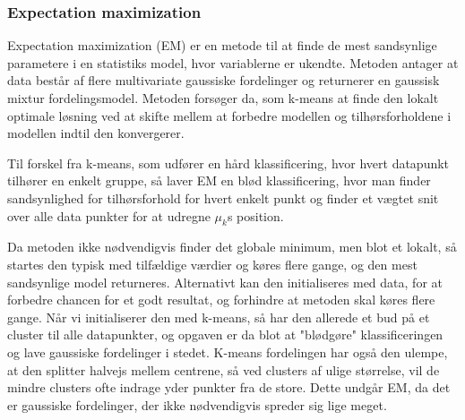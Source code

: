 \subsubsection{Expectation maximization}

Expectation maximization (EM) er en metode til at finde de mest sandsynlige
parametere i en statistiks model, hvor variablerne er ukendte. Metoden antager
at data består af flere multivariate gaussiske fordelinger og returnerer en
gaussisk mixtur fordelingsmodel. Metoden forsøger
da, som k-means at finde den lokalt optimale løsning ved at skifte mellem at
forbedre modellen og tilhørsforholdene i modellen indtil den konvergerer.

Til forskel fra k-means, som udfører en hård klassificering, hvor hvert
datapunkt tilhører en enkelt gruppe, så laver EM en blød klassificering, hvor
man finder sandsynlighed for tilhørsforhold for hvert enkelt punkt og finder et
vægtet snit over alle data punkter for at udregne $\mu_k$s position.

Da metoden ikke nødvendigvis finder det globale minimum, men blot et lokalt,
så startes den typisk med tilfældige værdier og køres flere gange, og
den mest sandsynlige model returneres. Alternativt kan den initialiseres med
data, for at forbedre chancen for et godt resultat, og forhindre at metoden
skal køres flere gange. Når vi initialiserer den med k-means, så har den
allerede et bud på et cluster til alle datapunkter, og opgaven er da blot
at "blødgøre" klassificeringen og lave gaussiske fordelinger i stedet. K-means
fordelingen har også den ulempe, at den splitter halvejs mellem centrene, så
ved clusters af ulige størrelse, vil de mindre clusters ofte indrage yder
punkter fra de store. Dette undgår EM, da det er gaussiske fordelinger, der
ikke nødvendigvis spreder sig lige meget.



